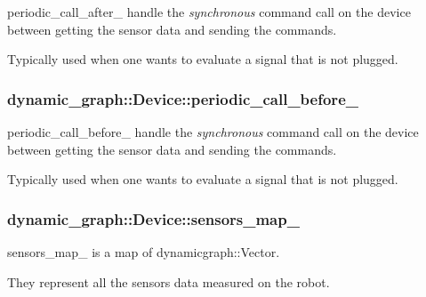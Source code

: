 periodic\+\_\+call\+\_\+after\+\_\+ handle the {\itshape synchronous} command call on the device between getting the sensor data and sending the commands. 

Typically used when one wants to evaluate a signal that is not plugged. 
\subsubsection[{\texorpdfstring{periodic\+\_\+call\+\_\+before\+\_\+}{periodic_call_before_}}]{ dynamic\+\_\+graph\+::\+Device\+::periodic\+\_\+call\+\_\+before\+\_\+\hspace{0.3cm}{\ttfamily [protected]}}\hypertarget{classdynamic__graph_1_1Device_afe6456e2d14701498bde6ed74fb0526a}{}\label{classdynamic__graph_1_1Device_afe6456e2d14701498bde6ed74fb0526a}


periodic\+\_\+call\+\_\+before\+\_\+ handle the {\itshape synchronous} command call on the device between getting the sensor data and sending the commands. 

Typically used when one wants to evaluate a signal that is not plugged. 
\subsubsection[{\texorpdfstring{sensors\+\_\+map\+\_\+}{sensors_map_}}]{ dynamic\+\_\+graph\+::\+Device\+::sensors\+\_\+map\+\_\+}\hypertarget{classdynamic__graph_1_1Device_a338b04580b75994516b8cc04d6605541}{}\label{classdynamic__graph_1_1Device_a338b04580b75994516b8cc04d6605541}


sensors\+\_\+map\+\_\+ is a map of dynamicgraph\+::\+Vector. 

They represent all the sensors data measured on the robot. 
